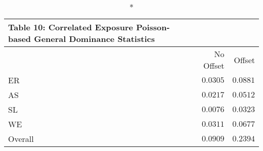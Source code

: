 \begin{longtable}{l|rr}
\caption*{
{\large Table 10: Correlated Exposure Poisson-based General Dominance Statistics}
} \\ 
\toprule
\multicolumn{1}{l}{} & No Offset & Offset \\ 
\midrule
ER & $0.0305$ & $0.0881$ \\ 
AS & $0.0217$ & $0.0512$ \\ 
SL & $0.0076$ & $0.0323$ \\ 
WE & $0.0311$ & $0.0677$ \\ 
Overall & $0.0909$ & $0.2394$ \\ 
\bottomrule
\end{longtable}

